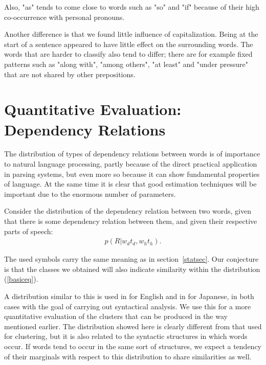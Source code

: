 Also, "as" tends to come close to words such as "so" and "if" because
of their high co-occurrence with personal pronouns.

Another difference is that we found little influence of
capitalization.  Being at the start of a sentence appeared to have
little effect on the surrounding words. The words that are harder to
classify also tend to differ; there are for example fixed patterns
such as "along with", "among others", "at least" and "under pressure"
that are not shared by other prepositions.

\section{Quantitative Evaluation: Dependency Relations}

The distribution of types of dependency relations between words is of
importance to natural language processing, partly because of the
direct practical application in parsing systems, but even more so
because it can show fundamental properties of language. At the same
time it is clear that good estimation techniques will be important due
to the enormous number of parameters.

Consider the distribution of the dependency relation between two
words, given that there is some dependency relation between them, and
given their respective parts of speech:
\begin{eqnarray}
p(R|w_{d}t_{d},w_{h}t_{h}) . \label{basiceq}
\end{eqnarray}

The used symbols carry the same meaning as in section~\ref{statsec}.  Our
conjecture is that the classes we obtained will also indicate similarity within
the distribution (\ref{basiceq}).

A distribution similar to this is used in \cite{collins96} for English and in
\cite{fujio97eng} for Japanese, in both cases with the goal of carrying out
syntactical analysis. We use this for a more quantitative evaluation of the
clusters that can be produced in the way mentioned earlier. The distribution
showed here is clearly different from that used for clustering, but it is also
related to the syntactic structures in which words occur. If words tend to occur
in the same sort of structures, we expect a tendency of their marginals with
respect to this distribution to share similarities as well.

